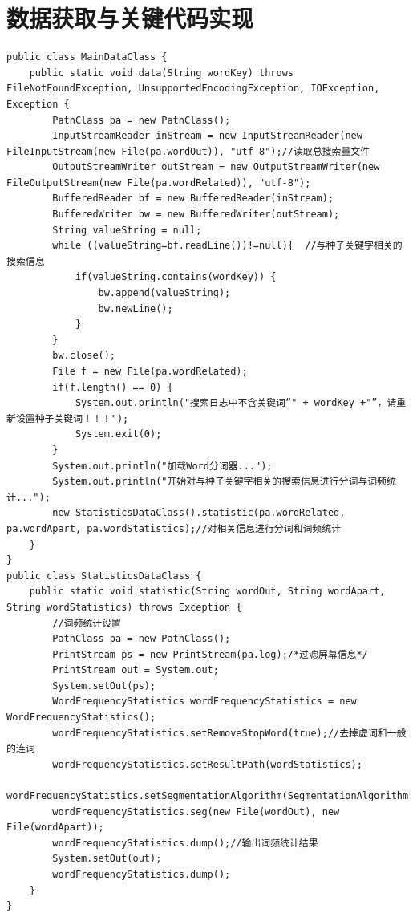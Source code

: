 \documentclass[12pt, a4paper, oneside]{ctexbook}
\begin{document}
\section{数据获取与关键代码实现}
\begin{lstlisting}
public class MainDataClass {
    public static void data(String wordKey) throws FileNotFoundException, UnsupportedEncodingException, IOException, Exception {
        PathClass pa = new PathClass();
        InputStreamReader inStream = new InputStreamReader(new FileInputStream(new File(pa.wordOut)), "utf-8");//读取总搜索量文件
        OutputStreamWriter outStream = new OutputStreamWriter(new FileOutputStream(new File(pa.wordRelated)), "utf-8");
        BufferedReader bf = new BufferedReader(inStream);
        BufferedWriter bw = new BufferedWriter(outStream);
        String valueString = null;
        while ((valueString=bf.readLine())!=null){  //与种子关键字相关的搜索信息
            if(valueString.contains(wordKey)) {
                bw.append(valueString);
                bw.newLine();
            } 
        }
        bw.close();
        File f = new File(pa.wordRelated);
        if(f.length() == 0) {
            System.out.println("搜索日志中不含关键词“" + wordKey +"”，请重新设置种子关键词！！！");
            System.exit(0);
        }
        System.out.println("加载Word分词器...");
        System.out.println("开始对与种子关键字相关的搜索信息进行分词与词频统计...");
        new StatisticsDataClass().statistic(pa.wordRelated, pa.wordApart, pa.wordStatistics);//对相关信息进行分词和词频统计
    }
}
public class StatisticsDataClass {
    public static void statistic(String wordOut, String wordApart, String wordStatistics) throws Exception {
        //词频统计设置
        PathClass pa = new PathClass();
        PrintStream ps = new PrintStream(pa.log);/*过滤屏幕信息*/
        PrintStream out = System.out;
        System.setOut(ps);
        WordFrequencyStatistics wordFrequencyStatistics = new WordFrequencyStatistics();
        wordFrequencyStatistics.setRemoveStopWord(true);//去掉虚词和一般的连词
        wordFrequencyStatistics.setResultPath(wordStatistics);
        wordFrequencyStatistics.setSegmentationAlgorithm(SegmentationAlgorithm.MaxNgramScore);
        wordFrequencyStatistics.seg(new File(wordOut), new File(wordApart));
        wordFrequencyStatistics.dump();//输出词频统计结果
        System.setOut(out);
        wordFrequencyStatistics.dump();
    }
}
\end{lstlisting}
\end{document}
